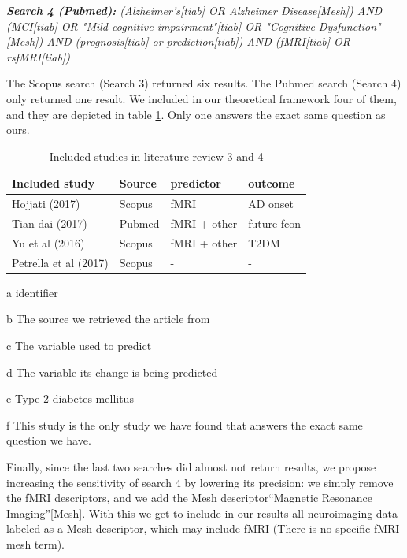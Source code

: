 		\noindent \textit{\textbf{Search 4 (Pubmed):} (Alzheimer's[tiab] OR Alzheimer Disease[Mesh]) AND (MCI[tiab] OR "Mild cognitive impairment"[tiab] OR "Cognitive Dysfunction"[Mesh]) AND (prognosis[tiab] or prediction[tiab]) AND  (fMRI[tiab] OR rsfMRI[tiab])}
		
	The Scopus search (Search 3) returned six results. The Pubmed search (Search 4) only returned one result. We included in our theoretical framework four of them, and they are depicted in table \ref{whatever3}. Only one answers the exact same question as ours.
		
		\begin{table}[h]
			\centering
			\begin{threeparttable}
				\caption{Included studies in literature review 3 and 4}
				\label{whatever3}	
				\begin{tabular}{llll}
					\toprule
					\textbf{Included study\tnote{a}} & \textbf{Source\tnote{b}} & \textbf{predictor\tnote{c}} & \textbf{outcome\tnote{d}} \\
					\midrule
					Hojjati (2017)\tnote{f}\cite{Hojjati201769} & Scopus & fMRI & AD onset \\
					Tian dai (2017)\cite{Dai2017772} & Pubmed & fMRI + other & future fcon\\
					Yu et al (2016)\cite{Yu2016} & Scopus & fMRI + other & T2DM\tnote{e} \\
					Petrella et al (2017)\cite{Petrella2007} & Scopus & - & - \\
					\bottomrule
					
								
				\end{tabular}
				\scriptsize\begin{tablenotes} %
					\item[a]{identifier}
					\item[b]{The source we retrieved the article from}
					\item[c]{The variable used to predict}
					\item[d]{The variable its change is being predicted}
					\item[e]{Type 2 diabetes mellitus}
					\item[f]{This study is the only study we have found that answers the exact same question we have.}					
				\end{tablenotes}
			\end{threeparttable}
		\end{table}
	
	
	Finally, since the last two searches did almost not return results, we propose increasing the sensitivity of search 4 by lowering its precision: we simply remove the fMRI descriptors, and we add the Mesh descriptor``Magnetic Resonance Imaging''[Mesh]. With this we get to include in our results all neuroimaging data labeled as a Mesh descriptor, which may include fMRI (There is no specific fMRI mesh term).
	
